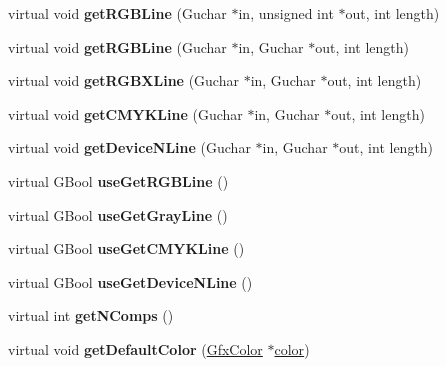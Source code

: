 \begin{DoxyCompactItemize}
\item 
\mbox{\label{class_gfx_device_r_g_b_color_space_aed850dbaa4062e3b2d7789384549ee4a}} 
virtual void {\bfseries get\+R\+G\+B\+Line} (Guchar $\ast$in, unsigned int $\ast$out, int length)
\item 
\mbox{\label{class_gfx_device_r_g_b_color_space_ab996257195c279f6c921a40fcea0f117}} 
virtual void {\bfseries get\+R\+G\+B\+Line} (Guchar $\ast$in, Guchar $\ast$out, int length)
\item 
\mbox{\label{class_gfx_device_r_g_b_color_space_aac2b92f89d84e3033baa28ea7dbccb67}} 
virtual void {\bfseries get\+R\+G\+B\+X\+Line} (Guchar $\ast$in, Guchar $\ast$out, int length)
\item 
\mbox{\label{class_gfx_device_r_g_b_color_space_a73009b552b45053ea75d3af19003095c}} 
virtual void {\bfseries get\+C\+M\+Y\+K\+Line} (Guchar $\ast$in, Guchar $\ast$out, int length)
\item 
\mbox{\label{class_gfx_device_r_g_b_color_space_aab8b6369a020869936b62cdb21b6e2f8}} 
virtual void {\bfseries get\+Device\+N\+Line} (Guchar $\ast$in, Guchar $\ast$out, int length)
\item 
\mbox{\label{class_gfx_device_r_g_b_color_space_ae51495df28ad70e9637e28a397bb0bfa}} 
virtual G\+Bool {\bfseries use\+Get\+R\+G\+B\+Line} ()
\item 
\mbox{\label{class_gfx_device_r_g_b_color_space_a042b0ea2007a7f1fb651bdc5da8b04e1}} 
virtual G\+Bool {\bfseries use\+Get\+Gray\+Line} ()
\item 
\mbox{\label{class_gfx_device_r_g_b_color_space_ad280c59e843b5764c4174d4a50b4bca0}} 
virtual G\+Bool {\bfseries use\+Get\+C\+M\+Y\+K\+Line} ()
\item 
\mbox{\label{class_gfx_device_r_g_b_color_space_aa504a34e8ce16c4669dc970b08070f83}} 
virtual G\+Bool {\bfseries use\+Get\+Device\+N\+Line} ()
\item 
\mbox{\label{class_gfx_device_r_g_b_color_space_a3eecf86dea0bf88bea603b2e3eaea74d}} 
virtual int {\bfseries get\+N\+Comps} ()
\item 
\mbox{\label{class_gfx_device_r_g_b_color_space_a82c3504662893f754c3bba5580776129}} 
virtual void {\bfseries get\+Default\+Color} (\hyperlink{struct_gfx_color}{Gfx\+Color} $\ast$\hyperlink{structcolor}{color})
\end{DoxyCompactItemize}
